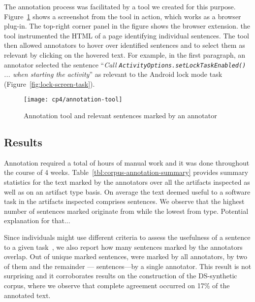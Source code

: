 The annotation process was facilitated by a tool we created for this purpose. Figure~\ref{fig:corpus-annotation-tool} shows a screenshot from the tool in 
action, which works as a browser plug-in. The top-right corner panel in the figure shows the browser extension. 
the tool instrumented the HTML of a page identifying individual sentences. The tool then allowed annotators to hover over identified sentences and to select them as relevant by clicking on the hovered text. For example, in the first paragraph, an annotator selected  the sentence
``\textit{Call {\small \texttt{ActivityOptions.setLockTaskEnabled()}} ... when starting the activity}'' as relevant to the Android lock mode task (Figure~\ref{fig:lock-screen-task}).







\begin{figure}
    \centering
    \texttt{[image: cp4/annotation-tool]}
    \caption{Annotation tool and relevant sentences marked by an annotator}
    \label{fig:corpus-annotation-tool}
\end{figure}




\subsection{Results}


Annotation required a total of  hours of manual work and it was done throughout the course of 4 weeks.
Table~\ref{tbl:corpus-annotation-summary} provides summary statistics for the text marked by 
the annotators over all the artifacts inspected as well as on an artifact type basis.
On average the text deemed useful to a software task in the artifacts inspected comprises 
 sentences. 
We observe that the highest number of sentences marked originate from 
while the lowest from  type. Potential explanation for that...











Since individuals might use different criteria to
assess the usefulness of a sentence to a given task~\cite{Barry1994, Barry1998, Freund2015},
we also report how many sentences marked by the annotators overlap.
Out of 
unique marked
sentences, 
 were marked by all annotators,
 by two of them and the remainder
--- sentences---by a single annotator.
This result is not surprising and it corroborates 
results on the construction of the \acs{DS-synthetic} 
corpus, where we observe that complete agreement 
occurred on 17\% of the annotated text.








